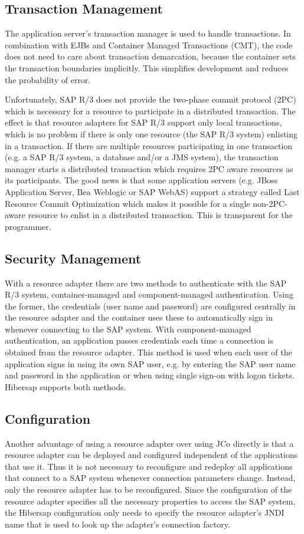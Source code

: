 \subsection{Transaction Management} 
The application server's transaction manager is used to handle transactions. In combination with EJBs and Container Managed Transactions (CMT), the code does not need to care about transaction demarcation, because the container sets the transaction boundaries implicitly. This simplifies development and reduces the probability of error. 

Unfortunately, SAP R/3 does not provide the two-phase commit protocol (2PC) which is necessary for a resource to participate in a distributed transaction. The effect is that resource adapters for SAP R/3 support only local transactions, which is no problem if there is only one resource (the SAP R/3 system) enlisting in a transaction. If there are multiple resources participating in one transaction (e.g. a SAP R/3 system, a database and/or a JMS system), the transaction manager starts a distributed transaction which requires 2PC aware resources as its participants. The good news is that some application servers (e.g. JBoss Application Server, Bea Weblogic or SAP WebAS) support a strategy called Last Resource Commit Optimization which makes it possible for a single non-2PC-aware resource to enlist in a distributed transaction. This is transparent for the programmer.


\subsection{Security Management}
With a resource adapter there are two methods to authenticate with the SAP R/3 system, container-managed and component-managed authentication. Using the former, the credentials (user name and password) are configured centrally in the resource adapter and the container uses these to automatically sign in whenever connecting to the SAP system. With component-managed authentication, an application passes credentials each time a connection is obtained from the resource adapter. This method is used when each user of the application signs in using its own SAP user, e.g. by entering the SAP user name and password in the application or when using single sign-on with logon tickets. Hibersap supports both methods.

\subsection{Configuration}
Another advantage of using a resource adapter over using JCo directly is that a resource adapter can be deployed and configured independent of the applications that use it. Thus it is not necessary to reconfigure and redeploy all applications that connect to a SAP system whenever connection parameters change. Instead, only the resource adapter has to be reconfigured. Since the configuration of the resource adapter specifies all the necessary properties to access the SAP system, the Hibersap configuration only needs to specify the resource adapter's JNDI name that is used to look up the adapter's connection factory. 

